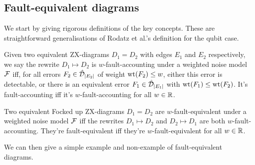\subsection{Fault-equivalent diagrams}

We start by giving rigorous definitions of the key concepts.
These are straightforward generalisations of Rodatz et al.'s definition for the qubit case.

\begin{definition}\label{defn:fault_accounting}
    Given two equivalent ZX-diagrams $D_1 = D_2$ with edges $E_1$ and $E_2$ respectively, we say the rewrite $D_1 \mapsto D_2$ is $w$-fault-accounting under a weighted noise model $\mathcal{F}$ iff, for all errors $F_2 \in \hat{\mathcal{D}}_{|E_2|}$ of weight $\operatorname{wt}(F_2) \leq w$, either this error is detectable, or there is an equivalent error $F_1 \in \hat{\mathcal{D}}_{|E_1|}$ with $\operatorname{wt}(F_1) \leq \operatorname{wt}(F_2)$.
    It's fault-accounting iff it's $w$-fault-accounting for all $w \in \mathbb{R}$.
\end{definition}

\begin{definition}\label{defn:fault_equivalent_diagrams}
    Two equivalent Focked up ZX-diagrams $D_1 = D_2$ are $w$-fault-equivalent under a weighted noise model $\mathcal{F}$ iff the rewrites $D_1 \mapsto D_2$ and $D_2 \mapsto D_1$ are both $w$-fault-accounting.
    They're fault-equivalent iff they're $w$-fault-equivalent for all $w \in \mathbb{R}$.
\end{definition}

We can then give a simple example and non-example of fault-equivalent diagrams.

